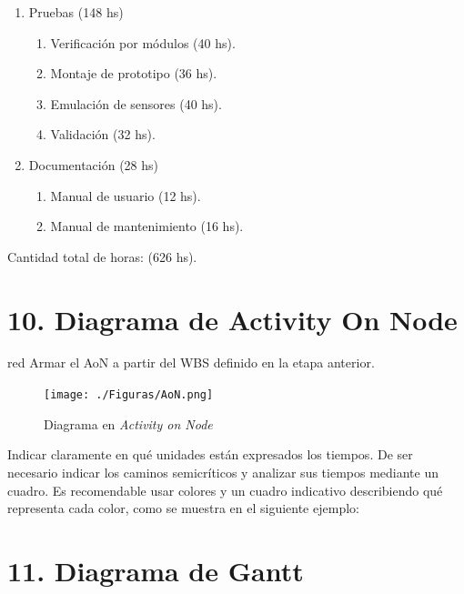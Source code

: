 \documentclass[
11pt, %
codirector, %
]{charter}
\begin{document}
\begin{enumerate}
\begin{enumerate}
	\end{enumerate}
\item Pruebas (148 hs)
	\begin{enumerate}
	\item Verificación por módulos (40 hs).
	\item Montaje de prototipo (36 hs).
	\item Emulación de sensores (40 hs).
	\item Validación (32 hs).
	\end{enumerate}
\item Documentación (28 hs)
	\begin{enumerate}
	\item Manual de usuario (12 hs).
	\item Manual de mantenimiento (16 hs).
	\end{enumerate}
\end{enumerate}

Cantidad total de horas: (626 hs).


\section{10. Diagrama de Activity On Node}
\label{sec:AoN}

\begin{consigna}{red}
Armar el AoN a partir del WBS definido en la etapa anterior. 



\end{consigna}

\begin{figure}[htpb]
\centering 
\texttt{[image: ./Figuras/AoN.png]}
\caption{Diagrama en \textit{Activity on Node}}
\label{fig:AoN}
\end{figure}

Indicar claramente en qué unidades están expresados los tiempos.
De ser necesario indicar los caminos semicríticos y analizar sus tiempos mediante un cuadro.
Es recomendable usar colores y un cuadro indicativo describiendo qué representa cada color, como se muestra en el siguiente ejemplo:



\section{11. Diagrama de Gantt}
\label{sec:gantt}
\end{document}

